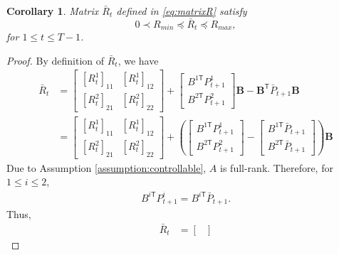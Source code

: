 \documentclass{article}
\newcommand{\transpose}{\mathsf{T}}
\newtheorem{corollary}{Corollary}
\begin{document}
\begin{corollary}
    Matrix $\bar{R}_{t}$ defined in \eqref{eq:matrixR} satisfy
    \begin{equation}
        0 \prec R_{min} \preceq \bar{R}_{t} \preceq R_{max},
    \end{equation}
    for $1\leq t \leq T-1$.
\end{corollary}
\begin{proof}
    By definition of $\bar{R}_{t}$, we have
    \begin{align*}
        \bar{R}_{t} &= 
        \begin{bmatrix}
            [R_{t}^{1}]_{11} & [R_{t}^{1}]_{12}\\
            [R_{t}^{2}]_{21} & [R_{t}^{2}]_{22}
        \end{bmatrix}
        + 
        \begin{bmatrix}
            B^{1\transpose}P_{t+1}^{1}\\
            B^{2\transpose}P_{t+1}^{2}
        \end{bmatrix}\mathbf{B}
        - \mathbf{B}^{\transpose}\bar{P}_{t+1}\mathbf{B}\\
        &= \begin{bmatrix}
            [R_{t}^{1}]_{11} & [R_{t}^{1}]_{12}\\
            [R_{t}^{2}]_{21} & [R_{t}^{2}]_{22}
        \end{bmatrix}
        + 
        (\begin{bmatrix}
            B^{1\transpose}P_{t+1}^{1}\\
            B^{2\transpose}P_{t+1}^{2}
        \end{bmatrix}-
        \begin{bmatrix}
            B^{1\transpose}\bar{P}_{t+1}\\
            B^{2\transpose}\bar{P}_{t+1}
        \end{bmatrix}
        )\mathbf{B}
    \end{align*}
    Due to Assumption \ref{assumption:controllable}, $A$ is full-rank. Therefore, for $1\leq i \leq 2$,
    \begin{align*}
        B^{i\transpose}P_{t+1}^{i} = B^{i\transpose}\bar{P}_{t+1}.
    \end{align*}
    Thus,
    \begin{align*}
        \bar{R}_{t} &= 
        \begin{bmatrix}

\end{bmatrix}
\end{align*}
\end{proof}
\end{document}
